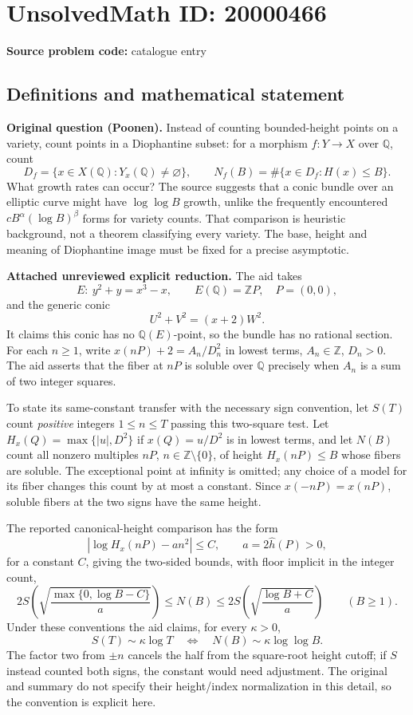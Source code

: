 \documentclass[11pt]{article}
\newcommand{\Z}{\mathbb{Z}}
\newcommand{\Q}{\mathbb{Q}}
\begin{document}
\section*{UnsolvedMath ID: 20000466}
\textbf{Source problem code:} catalogue entry
\subsection{Definitions and mathematical statement}
\textbf{Original question (Poonen).} Instead of counting bounded-height points on a variety, count points in a Diophantine subset: for a morphism $f:Y\to X$ over $\Q$, count
\[D_f=\{x\in X(\Q):Y_x(\Q)\ne\varnothing\},\qquad N_f(B)=\#\{x\in D_f:H(x)\le B\}.\]
What growth rates can occur? The source suggests that a conic bundle over an elliptic curve might have $\log\log B$ growth, unlike the frequently encountered $cB^\alpha(\log B)^\beta$ forms for variety counts. That comparison is heuristic background, not a theorem classifying every variety. The base, height and meaning of Diophantine image must be fixed for a precise asymptotic.

\textbf{Attached unreviewed explicit reduction.} The aid takes
\[E:\ y^2+y=x^3-x,\qquad E(\Q)=\Z P,\quad P=(0,0),\]
and the generic conic
\[U^2+V^2=(x+2)W^2.\]
It claims this conic has no $\Q(E)$-point, so the bundle has no rational section. For each $n\ge1$, write $x(nP)+2=A_n/D_n^2$ in lowest terms, $A_n\in\Z$, $D_n>0$. The aid asserts that the fiber at $nP$ is soluble over $\Q$ precisely when $A_n$ is a sum of two integer squares.

To state its same-constant transfer with the necessary sign convention, let $S(T)$ count \emph{positive} integers $1\le n\le T$ passing this two-square test. Let $H_x(Q)=\max\{|u|,D^2\}$ if $x(Q)=u/D^2$ is in lowest terms, and let $N(B)$ count all nonzero multiples $nP$, $n\in\Z\setminus\{0\}$, of height $H_x(nP)\le B$ whose fibers are soluble. The exceptional point at infinity is omitted; any choice of a model for its fiber changes this count by at most a constant. Since $x(-nP)=x(nP)$, soluble fibers at the two signs have the same height.

The reported canonical-height comparison has the form
\[|\log H_x(nP)-a n^2|\le C,\qquad a=2\widehat h(P)>0,\]
for a constant $C$, giving the two-sided bounds, with floor implicit in the integer count,
\[2S\left(\sqrt{\frac{\max\{0,\log B-C\}}a}\right)\le N(B)\le2S\left(\sqrt{\frac{\log B+C}a}\right)\qquad(B\ge1).\]
Under these conventions the aid claims, for every $\kappa>0$,
\[S(T)\sim\kappa\log T\quad\Longleftrightarrow\quad N(B)\sim\kappa\log\log B.\]
The factor two from $\pm n$ cancels the half from the square-root height cutoff; if $S$ instead counted both signs, the constant would need adjustment. The original and summary do not specify their height/index normalization in this detail, so the convention is explicit here.
\end{document}
